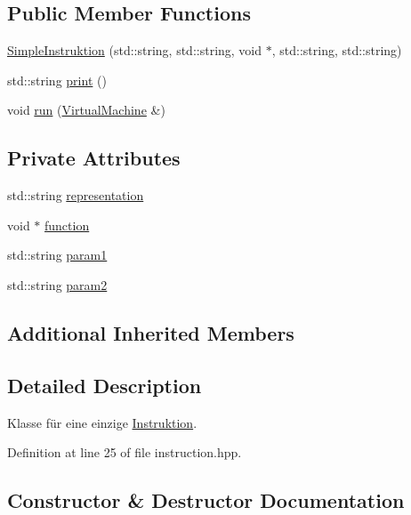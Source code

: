 \subsection*{Public Member Functions}
\begin{DoxyCompactItemize}
\item 
\mbox{\hyperlink{class_simple_instruktion_ac79f8b3b04c300e9eda72e09377e61a9}{Simple\+Instruktion}} (std\+::string, std\+::string, void $\ast$, std\+::string, std\+::string)
\item 
std\+::string \mbox{\hyperlink{class_simple_instruktion_a0533865319bd39a0ecd1db463d488cb8}{print}} ()
\item 
void \mbox{\hyperlink{class_simple_instruktion_a5beecc39bbd465d001c41216ef4d46e7}{run}} (\mbox{\hyperlink{class_virtual_machine}{Virtual\+Machine}} \&)
\end{DoxyCompactItemize}
\subsection*{Private Attributes}
\begin{DoxyCompactItemize}
\item 
std\+::string \mbox{\hyperlink{class_simple_instruktion_a1e2b7a4f9d38ec973e030062570c4fe2}{representation}}
\item 
void $\ast$ \mbox{\hyperlink{class_simple_instruktion_ab5d048147bade8aa9ebcd2e020eb0a92}{function}}
\item 
std\+::string \mbox{\hyperlink{class_simple_instruktion_a8a19958470817ee23384ac0c64fdc393}{param1}}
\item 
std\+::string \mbox{\hyperlink{class_simple_instruktion_a9682f053735fffdf061ec43a989482e2}{param2}}
\end{DoxyCompactItemize}
\subsection*{Additional Inherited Members}


\subsection{Detailed Description}
Klasse für eine einzige \mbox{\hyperlink{class_instruktion}{Instruktion}}. 

Definition at line 25 of file instruction.\+hpp.



\subsection{Constructor \& Destructor Documentation}
\mbox{\label{class_simple_instruktion_ac79f8b3b04c300e9eda72e09377e61a9}} 
